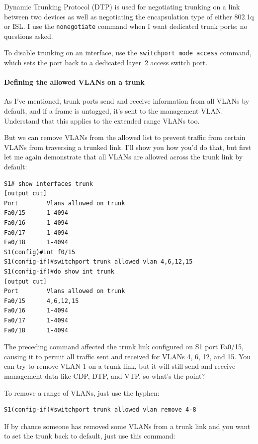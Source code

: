 \begin{note}
Dynamic Trunking Protocol (DTP) is used for negotiating trunking on a link between two devices as well as negotiating the encapsulation type of either 802.1q or ISL.
I use the \texttt{nonegotiate} command when I want dedicated trunk ports; no questions asked.
\end{note}


To disable trunking on an interface, use the \texttt{switchport\ mode\ access} command, which sets the port back to a dedicated layer~2 access switch port.

\paragraph{Defining the allowed VLANs on a trunk}

As I've mentioned, trunk ports send and receive information from all
VLANs by default, and if a frame is untagged, it's sent to the
management VLAN. Understand that this applies to the extended range
VLANs too.

But we can remove VLANs from the allowed list to prevent traffic from
certain VLANs from traversing a trunked link. I'll show you how you'd do
that, but first let me again demonstrate that all VLANs are allowed
across the trunk link by default:

\begin{verbatim}
S1# show interfaces trunk
[output cut]
Port        Vlans allowed on trunk
Fa0/15      1-4094
Fa0/16      1-4094
Fa0/17      1-4094
Fa0/18      1-4094
S1(config)#int f0/15
S1(config-if)#switchport trunk allowed vlan 4,6,12,15
S1(config-if)#do show int trunk
[output cut]
Port        Vlans allowed on trunk
Fa0/15      4,6,12,15
Fa0/16      1-4094
Fa0/17      1-4094
Fa0/18      1-4094
\end{verbatim}

The preceding command
affected the trunk link configured on S1 port Fa0/15, causing it to
permit all traffic sent and received for VLANs 4, 6, 12, and 15. You can
try to remove VLAN 1 on a trunk link, but it will still send and receive
management data like CDP, DTP, and VTP, so what's the point?

To remove a range of VLANs, just use the hyphen:

\begin{verbatim}
S1(config-if)#switchport trunk allowed vlan remove 4-8
\end{verbatim}

If by chance someone has removed some VLANs from a trunk link and you
want to set the trunk back to default, just use this command:

